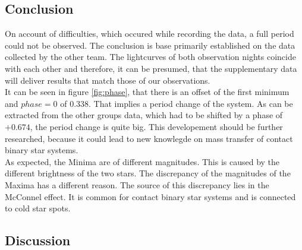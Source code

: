 \subsection{Conclusion}
  \label{sec:fuckoff}
  On account of difficulties, which occured while recording the data, a full period could not
  be observed. The conclusion is base primarily established on the data collected by the other team.
  The lightcurves of both observation nights coincide with each other and therefore, 
  it can be presumed, that the supplementary data will deliver results that match those of our 
  observations.\\
  \noindent It can be seen in figure \ref{fig:phase}, that there is an offset of the first minimum 
  and $phase = 0$ of $ 0.338$. That implies a period change of the system. As can be extracted from
  the other groups data, which had to be shifted by a phase of 
  $+0.674$, the period change is quite big. This developement should be 
  further researched, because it could lead to new knowlegde on mass transfer of contact binary
  star systems.\\
  \noindent As expected, the Minima are of different magnitudes. This is caused by the different brightness
  of the two stars. The discrepancy of the magnitudes of the Maxima has a different reason. The source 
  of this discrepancy lies in the McConnel effect. It is common for contact binary star systems 
  and is connected to cold star spots.

\subsection{Discussion}
  \label{sec:orange}
